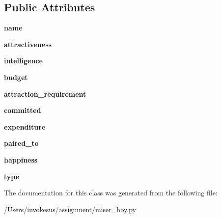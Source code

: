 \subsection*{Public Attributes}
\begin{DoxyCompactItemize}
\item 
\mbox{\label{classmiser__boy_1_1_miser___boy_a4fef98af2ef5ec76200c7f73c9c85595}} 
{\bfseries name}
\item 
\mbox{\label{classmiser__boy_1_1_miser___boy_aef56b8c9f25d84a582fe9f8d1f08b46f}} 
{\bfseries attractiveness}
\item 
\mbox{\label{classmiser__boy_1_1_miser___boy_aa9a491cfb4fb39ca51eadbc7c5a0ad6d}} 
{\bfseries intelligence}
\item 
\mbox{\label{classmiser__boy_1_1_miser___boy_ab7db7524892e7fb47bdd99d3ec46903f}} 
{\bfseries budget}
\item 
\mbox{\label{classmiser__boy_1_1_miser___boy_a71a88d49a6ae859f270b1d9fd27253f6}} 
{\bfseries attraction\+\_\+requirement}
\item 
\mbox{\label{classmiser__boy_1_1_miser___boy_a702e70ad741cbe29b54e1a83a840f27a}} 
{\bfseries committed}
\item 
\mbox{\label{classmiser__boy_1_1_miser___boy_a033ad6b02e36c334e16b3f101b0c3ec9}} 
{\bfseries expenditure}
\item 
\mbox{\label{classmiser__boy_1_1_miser___boy_a0474187e4a1d047b395aeb7bfdc1943a}} 
{\bfseries paired\+\_\+to}
\item 
\mbox{\label{classmiser__boy_1_1_miser___boy_acb776c80b3541f1efe5f66c81a8c4524}} 
{\bfseries happiness}
\item 
\mbox{\label{classmiser__boy_1_1_miser___boy_a2380dbb7e2289a7556b8bc9eb1e24466}} 
{\bfseries type}
\end{DoxyCompactItemize}


The documentation for this class was generated from the following file\+:\begin{DoxyCompactItemize}
\item 
/\+Users/invokesus/assignment/miser\+\_\+boy.\+py\end{DoxyCompactItemize}
